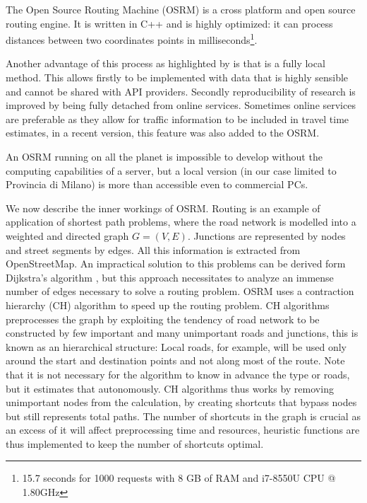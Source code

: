 \documentclass[11pt, titlepage]{article}
\begin{document}
The Open Source Routing Machine (OSRM) is a cross platform and open source routing engine. It is written in C++ and is highly optimized: it can process distances between two coordinates points in milliseconds\footnote{15.7 seconds for 1000 requests with 8 GB of RAM and i7-8550U CPU @ 1.80GHz}. 

Another advantage of this process as highlighted by \cite{Huber2016} is that is a fully local method. This allows firstly to be implemented with data that is highly sensible and cannot be shared with API providers. Secondly reproducibility of research is improved by being fully detached from online services. Sometimes online services are preferable as they allow for traffic information to be included in travel time estimates, in a recent version, this feature was also added to the OSRM. 

An OSRM running on all the planet is impossible to develop without the computing capabilities of a server, but a local version (in our case limited to Provincia di Milano) is more than accessible even to commercial PCs.

We now describe the inner workings of OSRM. Routing is an example of application of shortest path problems, where the road network is modelled into a weighted and directed graph $G = (V,E)$. Junctions are represented by nodes and street segments by edges. All this information is extracted from OpenStreetMap.  An impractical solution to this problems can be derived form Dijkstra's algorithm \parencite{algo}, but this approach necessitates to analyze an immense number of edges necessary to solve a routing problem. OSRM uses a contraction hierarchy (CH) algorithm to speed up the routing problem. CH algorithms preprocesses the graph by exploiting the tendency of road network to be constructed by few important and many unimportant roads and junctions, this is known as an hierarchical structure: Local roads, for example, will be used only around the start and destination points and not along most of the route. Note that it is not necessary for the algorithm to know in advance the type or roads, but it estimates that autonomously. CH algorithms thus works by removing unimportant nodes from the calculation, by creating  shortcuts that bypass nodes but still represents total paths. The number of shortcuts in the graph is crucial as an excess of it will affect preprocessing time and resources, heuristic functions are thus implemented to keep the number of shortcuts optimal. \parencite{Geisberger2012}
\end{document}
